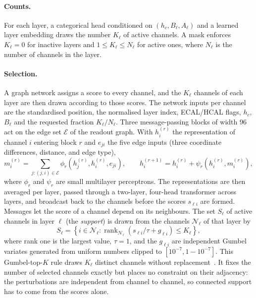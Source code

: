 \documentclass[11pt]{article}
\begin{document}
\paragraph{Counts.} For each layer, a categorical head conditioned on $(h_c,B_\ell,A_\ell)$ and a learned layer embedding draws the number $K_\ell$ of active channels. A mask enforces $K_\ell=0$ for inactive layers and $1\leq K_\ell\leq N_\ell$ for active ones, where $N_\ell$ is the number of channels in the layer.

\paragraph{Selection.} A graph network assigns a score to every channel, and the $K_\ell$ channels of each layer are then drawn according to those scores. The network inputs per channel are the standardised position, the normalised layer index, ECAL/HCAL flags, $h_c$, $B_\ell$ and the requested fraction $K_\ell/N_\ell$. Three message-passing blocks of width 96 act on the edge set $\mathcal E$ of the readout graph. With $h_i^{(r)}$ the representation of channel $i$ entering block $r$ and $e_{ji}$ the five edge inputs (three coordinate differences, distance, and edge type),
\begin{equation}
 m_i^{(r)}=\sum_{j:(j,i)\in\mathcal E}
 \phi_r(h_j^{(r)},h_i^{(r)},e_{ji}),\qquad
 h_i^{(r+1)}=h_i^{(r)}+\psi_r(h_i^{(r)},m_i^{(r)}),
 \label{eq:message}
\end{equation}
where $\phi_r$ and $\psi_r$ are small multilayer perceptrons. The representations are then averaged per layer, passed through a two-layer, four-head transformer across layers, and broadcast back to the channels before the scores $s_{\ell i}$ are formed. Messages let the score of a channel depend on its neighbours. The set $S_\ell$ of active channels in layer $\ell$ (the \emph{support}) is drawn from the channels $\mathcal N_\ell$ of that layer by
\begin{equation}
 S_\ell=\left\{i\in\mathcal N_\ell:
 \operatorname{rank}_{\mathcal N_\ell}(s_{\ell i}/\tau+g_{\ell i})\leq K_\ell\right\},
 \label{eq:topk}
\end{equation}
where rank one is the largest value, $\tau=1$, and the $g_{\ell i}$ are independent Gumbel variates generated from uniform numbers clipped to $[10^{-7},1-10^{-7}]$. This Gumbel-top-$K$ rule draws $K_\ell$ distinct channels without replacement~\cite{gumbeltopk}. It fixes the number of selected channels exactly but places no constraint on their adjacency: the perturbations are independent from channel to channel, so connected support has to come from the scores alone.
\end{document}
